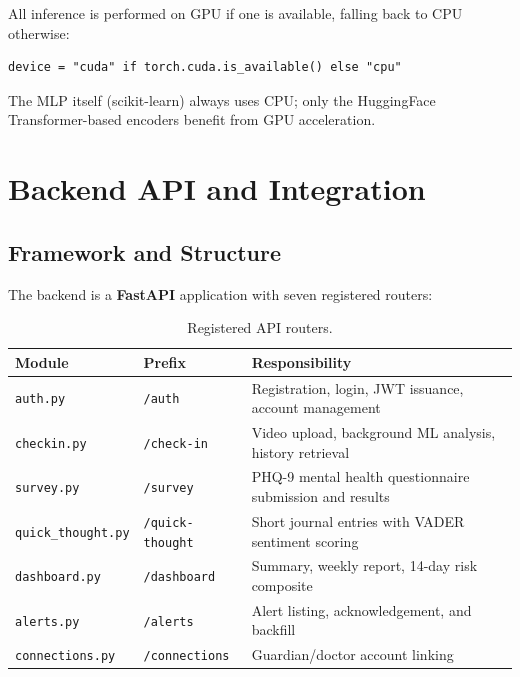 \documentclass[12pt,a4paper]{article}
\begin{document}
All inference is performed on GPU if one is available, falling back to CPU
otherwise:

\begin{lstlisting}[caption={Device selection.}]
device = "cuda" if torch.cuda.is_available() else "cpu"
\end{lstlisting}

The MLP itself (scikit-learn) always uses CPU; only the HuggingFace
Transformer-based encoders benefit from GPU acceleration.

\section{Backend API and Integration}
\label{sec:backend}

\subsection{Framework and Structure}

The backend is a \textbf{FastAPI} application with seven registered routers:

\begin{table}[H]
\centering
\caption{Registered API routers.}
\label{tab:routers}
\begin{tabular}{lll}
\toprule
\textbf{Module} & \textbf{Prefix} & \textbf{Responsibility} \\
\midrule
\texttt{auth.py}          & \texttt{/auth}         & Registration, login, JWT issuance, account management \\
\texttt{checkin.py}       & \texttt{/check-in}     & Video upload, background ML analysis, history retrieval \\
\texttt{survey.py}        & \texttt{/survey}       & PHQ-9 mental health questionnaire submission and results \\
\texttt{quick\_thought.py}& \texttt{/quick-thought}& Short journal entries with VADER sentiment scoring \\
\texttt{dashboard.py}     & \texttt{/dashboard}    & Summary, weekly report, 14-day risk composite \\
\texttt{alerts.py}        & \texttt{/alerts}       & Alert listing, acknowledgement, and backfill \\
\texttt{connections.py}   & \texttt{/connections}  & Guardian/doctor account linking \\
\bottomrule
\end{tabular}
\end{table}
\end{document}
